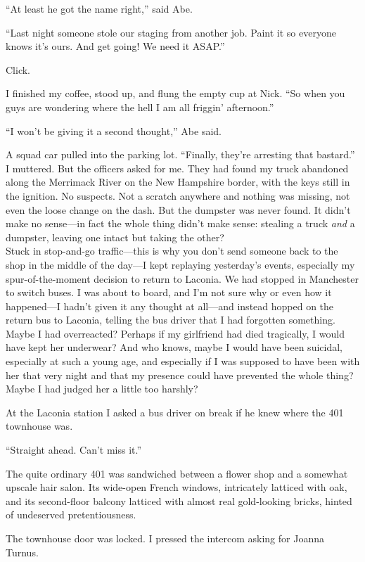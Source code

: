 ``At least he got the name right,'' said Abe.

``Last night someone stole our staging from another job. Paint it so
everyone knows it's ours. And get going! We need it ASAP.''

Click.

I finished my coffee, stood up, and flung the empty cup at Nick. ``So
when you guys are wondering where the hell I am all friggin'
afternoon.''

``I won't be giving it a second thought,'' Abe said.

A squad car pulled into the parking lot. ``Finally, they're arresting
that bastard.'' I muttered. But the officers asked for me. They had
found my truck abandoned along the Merrimack River on the New Hampshire
border, with the keys still in the ignition. No suspects. Not a scratch
anywhere and nothing was missing, not even the loose change on the dash.
But the dumpster was never found. It didn't make no sense---in fact the
whole thing didn't make sense: stealing a truck \emph{and} a dumpster,
leaving one intact but taking the other?\\

Stuck in stop-and-go traffic---this is why you don't send someone back
to the shop in the middle of the day---I kept replaying yesterday's
events, especially my spur-of-the-moment decision to return to Laconia.
We had stopped in Manchester to switch buses. I was about to board, and
I'm not sure why or even how it happened---I hadn't given it any thought
at all---and instead hopped on the return bus to Laconia, telling the
bus driver that I had forgotten something. Maybe I had overreacted?
Perhaps if my girlfriend had died tragically, I would have kept her
underwear? And who knows, maybe I would have been suicidal, especially
at such a young age, and especially if I was supposed to have been with
her that very night and that my presence could have prevented the whole
thing? Maybe I had judged her a little too harshly?

At the Laconia station I asked a bus driver on break if he knew where
the 401 townhouse was.

``Straight ahead. Can't miss it.''

The quite ordinary 401 was sandwiched between a flower shop and a
somewhat upscale hair salon. Its wide-open French windows, intricately
latticed with oak, and its second-floor balcony latticed with almost
real gold-looking bricks, hinted of undeserved pretentiousness.

The townhouse door was locked. I pressed the intercom asking for Joanna
Turnus.

